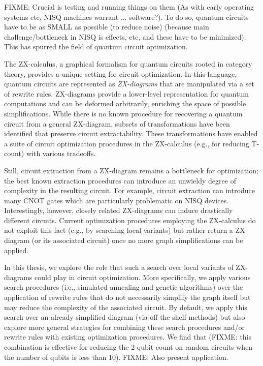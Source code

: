 FIXME: Crucial is testing and running things on them (As with early operating systems etc, NISQ machines warrant ... software?). To do so, quantum circuits have to be as SMALL as possible (to reduce noise) (because main challenge/bottleneck in NISQ is effects, etc, and these have to be minimized). This has spurred the field of quantum circuit optimization.
\fi


The ZX-calculus, a graphical formalism for quantum circuits rooted in category theory, provides a unique setting for circuit optimization.
In this language, quantum circuits are represented as \emph{ZX-diagrams} that are manipulated via a set of rewrite rules.
ZX-diagrams provide a lower-level representation for quantum computations and can be deformed arbitrarily, enriching the space of possible simplifications.
While there is no known procedure for recovering a quantum circuit from a general ZX-diagram, subsets of transformations have been identified that preserve circuit extractability.
These transformations have enabled a suite of circuit optimization procedures in the ZX-calculus (e.g., for reducing T-count) with various tradeoffs.

Still, circuit extraction from a ZX-diagram remains a bottleneck for optimization;
the best known extraction procedures can introduce an unwieldy degree of complexity in the resulting circuit.
For example, circuit extraction can introduce many CNOT gates which are particularly problematic on NISQ devices.
Interestingly, however, closely related ZX-diagrams can induce drastically different circuits.
Current optimization procedures employing the ZX-calculus do not exploit this fact (e.g., by searching local variants) but rather return a ZX-diagram (or its associated circuit) once no more graph simplifications can be applied.

In this thesis, we explore the role that such a search over local variants of ZX-diagrams could play in circuit optimization.
More specifically, we apply various search procedures (i.e., simulated annealing and genetic algorithms) over the application of rewrite rules that do not necessarily simplify the graph itself but may reduce the complexity of the associated circuit.
By default, we apply this search over an already simplified diagram (via off-the-shelf methods) but also explore more general strategies for combining these search procedures and/or rewrite rules with existing optimization procedures.
We find that (FIXME: this combination is effective for reducing the 2-qubit count on random circuits when the number of qubits is less than 10).
FIXME: Also present application.
